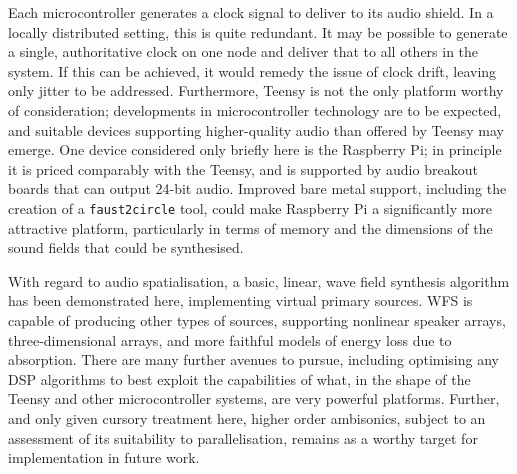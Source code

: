 Each microcontroller generates a clock signal to deliver to its audio shield.
In a locally distributed setting, this is quite redundant.
It may be possible to generate a single, authoritative clock on one node and
deliver that to all others in the system.
If this can be achieved, it would remedy the issue of clock drift, leaving only
jitter to be addressed.
Furthermore, Teensy is not the only platform worthy of consideration;
developments in microcontroller technology are to be expected, and suitable
devices supporting higher-quality audio than offered by Teensy may emerge.
One device considered only briefly here is the Raspberry Pi;
in principle it is priced comparably with the Teensy, and is supported by audio
breakout boards that can output 24-bit audio.
Improved bare metal support, including the creation of a \texttt{faust2circle}
tool, could make Raspberry Pi a significantly more attractive platform,
particularly in terms of memory and the dimensions of the sound fields that
could be synthesised.

With regard to audio spatialisation, a basic, linear, wave field synthesis
algorithm has been demonstrated here, implementing virtual primary sources.
WFS is capable of producing other types of sources, supporting nonlinear
speaker arrays, three-dimensional arrays, and more faithful models of
energy loss due to absorption.
There are many further avenues to pursue, including optimising any DSP
algorithms to best exploit the capabilities of what, in the shape of the
Teensy and other microcontroller systems, are very powerful platforms.
Further, and only given cursory treatment here, higher order ambisonics, subject
to an assessment of its suitability to parallelisation, remains as a worthy
target for implementation in future work.
